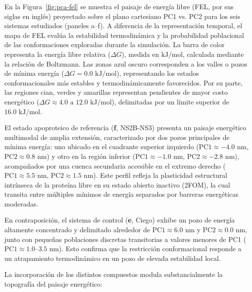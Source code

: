 En la Figura~\ref{fig:pca-fel} se muestra el paisaje de energía libre (FEL, por sus siglas en inglés) proyectado sobre el plano cartesiano PC1 vs. PC2 para los seis sistemas estudiados (paneles a--f). A diferencia de la representación temporal, el mapa de FEL evalúa la estabilidad termodinámica y la probabilidad poblacional de las conformaciones exploradas durante la simulación. La barra de color representa la energía libre relativa ($\Delta G$), medida en $\text{kJ/mol}$, calculada mediante la relación de Boltzmann. Las zonas azul oscuro corresponden a los valles o pozos de mínima energía ($\Delta G = 0.0\text{ kJ/mol}$), representando los estados conformacionales más estables y termodinámicamente favorecidos. Por su parte, las regiones cian, verdes y amarillas representan pendientes de mayor costo energético ($\Delta G \approx 4.0\text{ a }12.0\text{ kJ/mol}$), delimitadas por un límite superior de $16.0\text{ kJ/mol}$.

El estado apoproteico de referencia (\textbf{f}, NS2B-NS3) presenta un paisaje energético multimodal de amplia extensión, caracterizado por dos pozos principales de mínima energía: uno ubicado en el cuadrante superior izquierdo ($\text{PC1} \approx -4.0\text{ nm}$, $\text{PC2} \approx 0.8\text{ nm}$) y otro en la región inferior ($\text{PC1} \approx -1.0\text{ nm}$, $\text{PC2} \approx -2.8\text{ nm}$), acompañados por una cuenca secundaria accesible en el extremo derecho ($\text{PC1} \approx 5.5\text{ nm}$, $\text{PC2} \approx 1.5\text{ nm}$). Este perfil refleja la plasticidad estructural intrínseca de la proteína libre en su estado abierto inactivo (2FOM), la cual transita entre múltiples mínimos de energía separados por barreras energéticas moderadas.

En contraposición, el sistema de control (\textbf{e}, Ciego) exhibe un pozo de energía altamente concentrado y delimitado alrededor de $\text{PC1} \approx 6.0\text{ nm}$ y $\text{PC2} \approx 0.0\text{ nm}$, junto con pequeñas poblaciones discretas transitorias a valores menores de PC1 ($\text{PC1} \approx 1.0\text{--}3.5\text{ nm}$). Esto confirma que la restricción conformacional responde a un atrapamiento termodinámico en un pozo de elevada estabilidad local.

La incorporación de los distintos compuestos modula substancialmente la topografía del paisaje energético:

